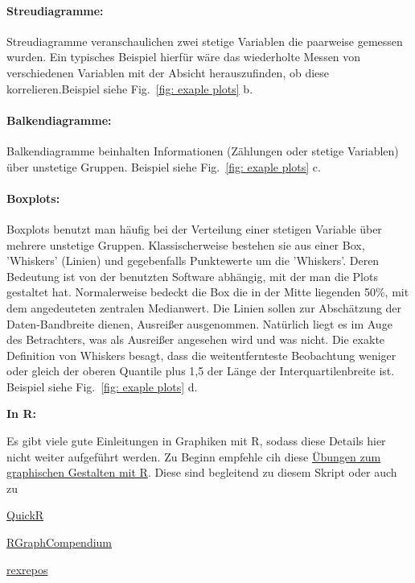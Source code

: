 \documentclass[a4paper,twoside]{tufte-book}\usepackage[]{graphicx}\usepackage[]{color}
\begin{document}
\paragraph{Streudiagramme:} Streudiagramme veranschaulichen zwei stetige Variablen die paarweise gemessen wurden. Ein typisches Beispiel hierfür wäre das wiederholte Messen von verschiedenen Variablen mit der Absicht herauszufinden, ob diese korrelieren.Beispiel siehe Fig.~\ref{fig: exaple plots} b.

\paragraph{Balkendiagramme:} Balkendiagramme beinhalten Informationen (Zählungen oder stetige Variablen) über unstetige Gruppen. Beispiel siehe Fig.~\ref{fig: exaple plots} c.

\paragraph{Boxplots:} Boxplots benutzt man häufig bei der Verteilung einer stetigen Variable über mehrere unstetige Gruppen. Klassischerweise bestehen sie aus einer Box, 'Whiskers' (Linien) und gegebenfalls Punktewerte um die 'Whiskers'. Deren Bedeutung ist von der benutzten Software abhängig, mit der man die Plots gestaltet hat. Normalerweise bedeckt die Box die in der Mitte liegenden 50\%, mit dem angedeuteten zentralen Medianwert. Die Linien sollen zur Abschätzung der Daten-Bandbreite dienen, Ausreißer ausgenommen. Natürlich liegt es im Auge des Betrachters, was als Ausreißer angesehen wird und was nicht. Die exakte Definition von Whiskers besagt, dass die weitentfernteste Beobachtung weniger oder gleich der oberen Quantile plus 1,5 der Länge der Interquartilenbreite ist. Beispiel siehe Fig.~\ref{fig: exaple plots} d.

\vspace{1cm}
\begin{fullwidth}
\begin{mdframed}
    
\textbf{In R:} 

Es gibt viele gute Einleitungen in Graphiken mit R, sodass diese Details hier nicht weiter aufgeführt werden. Zu Beginn empfehle cih diese  \href{https://github.com/florianhartig/ResearchSkills/tree/master/Labs/Statistics/Practicals/GraphicsInR}{Übungen zum graphischen Gestalten mit R}. Diese sind begleitend zu diesem Skript oder auch zu

\begin{itemize*}
  \item \href{http://www.statmethods.net/graphs/index.html}{QuickR}
  \item \href{http://shinyapps.org/apps/RGraphCompendium/index.php}{RGraphCompendium}
  \item \href{http://www.uni-kiel.de/psychologie/rexrepos/rerDiagrams.html}{rexrepos}
\end{itemize*}

\end{mdframed}
\end{fullwidth} 
\end{document}
